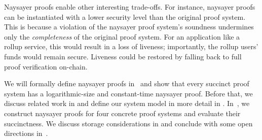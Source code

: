 Naysayer proofs enable other interesting trade-offs. 
For instance, naysayer proofs can be instantiated with a lower security level than the original proof system.
This is because a violation of the naysayer proof system's soundness undermines only the \emph{completeness} of the original proof system. %
For an application like a rollup service, this would result in a loss of liveness; importantly, the rollup users' funds would remain secure. 
Liveness could be restored by falling back to full proof verification on-chain.


We will formally define naysayer proofs in~ and show that every succinct proof system has a logarithmic-size and constant-time naysayer proof. Before that, we discuss related work in  and define our system model in more detail in .
In~, we construct naysayer proofs for four concrete proof systems and evaluate their succinctness. %
We discuss storage considerations in  and conclude with some open directions in~.